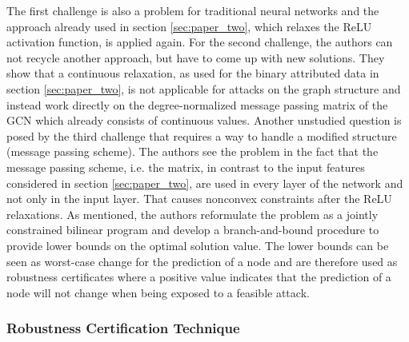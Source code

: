 \documentclass[a4paper,preprint]{sig-alternate}
\begin{document}
The first challenge is also a problem for traditional neural networks and the approach already used
in section \ref{sec:paper_two}, which relaxes the ReLU activation function, is applied again. \cite{10.1145/3394486.3403217}
For the second challenge, the authors can not recycle another approach, but have to come up with new solutions.
They show that a continuous relaxation, as used for the binary attributed data in section \ref{sec:paper_two}, 
is not applicable for attacks on the graph structure and instead work directly on the degree-normalized message passing matrix 
of the GCN which already consists of continuous values.
Another unstudied question is posed by the third challenge that requires a way to handle a modified structure (message passing scheme). \cite{10.1145/3394486.3403217}
The authors see the problem in the fact that the message passing scheme, i.e. the matrix, in contrast to the input features considered
in section \ref{sec:paper_two}, are used in every layer of the network and not only in the input layer.
That causes nonconvex constraints after the ReLU relaxations. \cite{10.1145/3394486.3403217}
As mentioned, the authors reformulate the problem as a jointly constrained bilinear program and develop a branch-and-bound procedure 
to provide lower bounds on the optimal solution value.
The lower bounds can be seen as worst-case change for the prediction of a node and are therefore used as 
robustness certificates where a positive value indicates that the prediction of a node will not
change when being exposed to a feasible attack. \cite{10.1145/3394486.3403217}

\subsubsection{Robustness Certification Technique}
\end{document}
